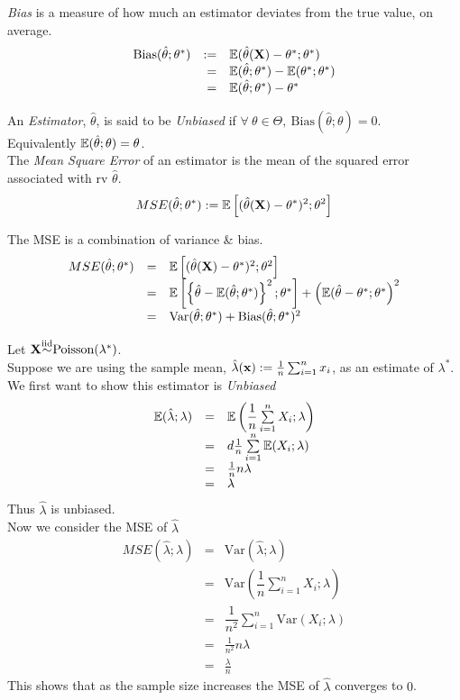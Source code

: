 \documentclass[11pt,a4paper]{article}
\begin{document}
\textit{Bias} is a measure of how much an estimator deviates from the true value, on average.
\[\begin{array}{rrl}
\text{Bias}(\hat{\theta};\theta^*)&:=&\mathbb{E}(\hat{\theta}(\textbf{X})-\theta^*;\theta^*)\\
&=&\mathbb{E}(\hat{\theta};\theta^*)-\mathbb{E}(\theta^*;\theta^*)\\
&=&\mathbb{E}(\hat{\theta};\theta^*)-\theta^*
\end{array}\]

An \textit{Estimator}, $\hat{\theta}$, is said to be \textit{Unbiased} if $\forall\ \theta\in\Theta,\ \text{Bias}(\hat{\theta};\theta)=0$.\\
Equivalently $\mathbb{E}(\hat{\theta};\theta)=\theta$.\\

The \textit{Mean Square Error} of an estimator is the mean of the squared error associated with rv $\hat{\theta}$.
$$MSE(\hat{\theta};\theta^*):=\mathbb{E}\left[(\hat{\theta}(\textbf{X})-\theta^*)^2;\theta^2\right]$$

The MSE is a combination of variance \& bias.
\[\begin{array}{rcl}
MSE(\hat{\theta};\theta^*)&=&\mathbb{E}\left[(\hat{\theta}(\textbf{X})-\theta^*)^2;\theta^2\right]\\
&=&\mathbb{E}\left[\left\{\hat{\theta}-\mathbb{E}(\hat{\theta};\theta^*)\right\}^2;\theta^*\right]+\left(\mathbb{E}(\hat{\theta}-\theta^*;\theta^*\right)^2\\
&=&\text{Var}(\hat{\theta};\theta^*)+\text{Bias}(\hat{\theta};\theta^*)^2
\end{array}\]

Let $\textbf{X}{\overset{\text{iid}}{\sim}}\text{Poisson}(\lambda^*)$.\\
Suppose we are using the sample mean, $\hat{\lambda}(\textbf{x}):=\frac{1}{n}\sum_{i=1}^nx_i$, as an estimate of $\lambda^*$. We first want to show this estimator is \textit{Unbiased}
\[\begin{array}{rrl}
\mathbb{E}(\hat{\lambda};\lambda)&=&\mathbb{E}\left(\dfrac{1}{n}\sum\limits_{i=1}^nX_i;\lambda\right)\\
&=&d\frac{1}{n}\sum\limits_{i=1}^n\mathbb{E}(X_i;\lambda)\\
&=&\frac{1}{n}n\lambda\\
&=&\lambda\\
\end{array}\]
Thus $\hat{\lambda}$ is unbiased.\\
Now we consider the MSE of $\hat{\lambda}$
\[\begin{array}{rcl}
MSE(\hat{\lambda};\lambda)&=&\text{Var}(\hat{\lambda};\lambda)\\
&=&\text{Var}\left(\dfrac{1}{n}\sum\limits_{i=1}^nX_i;\lambda\right)\\
&=&\dfrac{1}{n^2}\sum\limits_{i=1}^n\text{Var}(X_i;\lambda)\\
&=&\frac{1}{n^2}n\lambda\\
&=&\frac{\lambda}{n}
\end{array}\]
This shows that as the sample size increases the MSE of $\hat{\lambda}$ converges to $0$.
\end{document}
